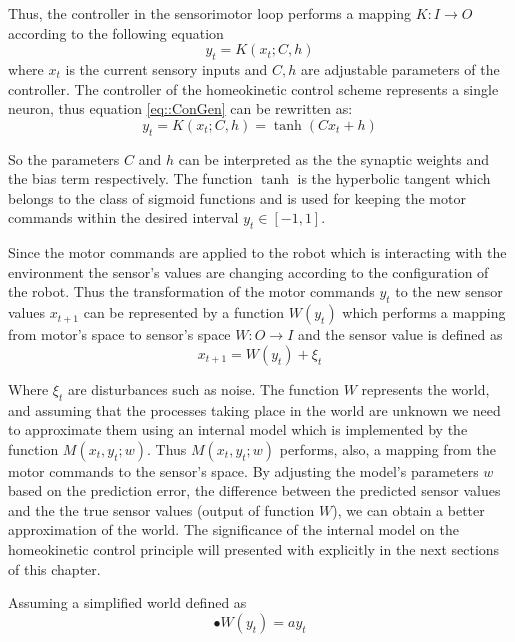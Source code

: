\documentclass[msc,ai,logo]{infthesis}
\begin{document}
Thus, the controller in the sensorimotor loop performs a mapping $K: I \rightarrow O$ according to the following equation
 \begin{equation}
 \label{eq::ConGen}
y_{t}=K(x_{t};C,h)
\end{equation}
where $x_{t}$ is the current sensory inputs and $C,h$ are adjustable parameters of the controller. The controller of the homeokinetic control scheme represents a single neuron, thus equation \ref{eq::ConGen} can be rewritten as:
\begin{equation}
\label{eq:controller}
y_{t}=K(x_{t};C,h)=\tanh(Cx_{t}+h)
\end{equation}  

So the parameters $C$ and $h$ can be interpreted as the 
the synaptic weights and the bias term respectively. The function $\tanh$ is the hyperbolic tangent which belongs to the class of sigmoid functions and is used for keeping the motor commands within the desired interval $y_{t} \in [-1,1] $.

Since the motor commands are applied to the robot which is interacting with the environment the sensor's values are changing according to the configuration of the robot. Thus the transformation of the motor commands $y_{t}$ to the new sensor values $x_{t+1}$ can be represented by a function $W(y_{t})$ which performs a mapping from motor's space to sensor's space $W: O \rightarrow I$
and the sensor value is defined as 
\begin{equation}
\label{eq:world}
x_{t+1}=W(y_{t})+ \xi_{t}
\end{equation}

Where $\xi_{t}$ are disturbances such as noise. The function $W$ represents the world, and assuming that the processes taking place in the world are unknown we need to approximate them using an internal model which is implemented by the function $M(x_{t},y_{t};w)$. Thus $M(x_{t},y_{t};w)$ performs, also, a mapping from the motor commands to the sensor's space. By adjusting the model's parameters $w$ based on the prediction error, the difference between the predicted sensor values and the the true sensor values (output of function $W$), we can obtain a better approximation of the world. The significance of the internal model on the homeokinetic control principle will presented with explicitly in the next sections of this chapter.

Assuming a simplified world defined as 
\begin{equation}
•W(y_{t})=a y_{t}
\end{equation}
\end{document}
